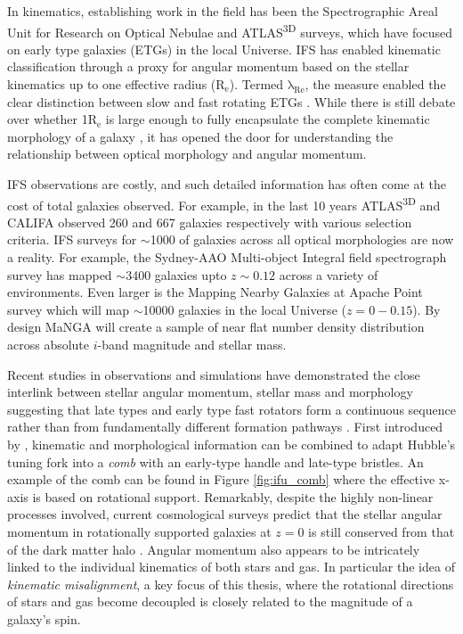 In kinematics, establishing work in the field has been the Spectrographic Areal Unit for Research on Optical Nebulae \citep[SAURON;][]{sauron} and ATLAS\textsuperscript{3D} \citep{atlas3d} surveys, which have focused on early type galaxies (ETGs) in the local Universe. IFS has enabled kinematic classification through a proxy for angular momentum based on the stellar kinematics up to one effective radius ($\mathrm{R_e}$). Termed $\mathrm{\lambda_{Re}}$, the measure enabled the clear distinction between slow and fast rotating ETGs \citep{emsellem2007, emsellem2011}. While there is still debate over whether 1$\mathrm{R_{e}}$ is large enough to fully encapsulate the complete kinematic morphology of a galaxy \citep{foster2013, arnold2014}, it has opened the door for understanding the relationship between optical morphology and angular momentum. 

IFS observations are costly, and such detailed information has often come at the cost of total galaxies observed. For example, in the last 10 years ATLAS\textsuperscript{3D} and CALIFA \citep{califa} observed 260 and 667 galaxies respectively with various selection criteria. IFS surveys for $\sim$1000 of galaxies across all optical morphologies are now a reality. For example, the Sydney-AAO  Multi-object  Integral  field  spectrograph  survey \citep[][]{croom2012, bryant2015} has mapped $\sim$3400 galaxies upto $z\sim0.12$ across a variety of environments. Even larger is the Mapping Nearby Galaxies at Apache Point \citep[MaNGA;][]{bundy2015, blanton2017} survey which will map $\sim$10000 galaxies in the local Universe ($z=0-0.15$). By design MaNGA will create a sample of near flat number density distribution across absolute $i$-band magnitude and stellar mass.

Recent studies in observations and simulations have demonstrated the close interlink between stellar angular momentum, stellar mass and morphology suggesting that late types and early type fast rotators form a continuous sequence rather than from fundamentally different formation pathways \citep[][]{cortese2016, lagos2017, graham2018}. First introduced by \citet{cappellari2011}, kinematic and morphological information can be combined to adapt Hubble's tuning fork into a \textit{comb} with an early-type handle and late-type bristles. An example of the comb can be found in Figure \ref{fig:ifu_comb} where the effective x-axis is based on rotational support. Remarkably, despite the highly non-linear processes involved, current cosmological surveys predict that the stellar angular momentum in rotationally supported galaxies at $z=0$ is still conserved from that of the dark matter halo \citep[e.g.][]{genel2015}. Angular momentum also appears to be intricately linked to the individual kinematics of both stars and gas. In particular the idea of \textit{kinematic misalignment}, a key focus of this thesis, where the rotational directions of stars and gas become decoupled is closely related to the magnitude of a galaxy's spin. 

